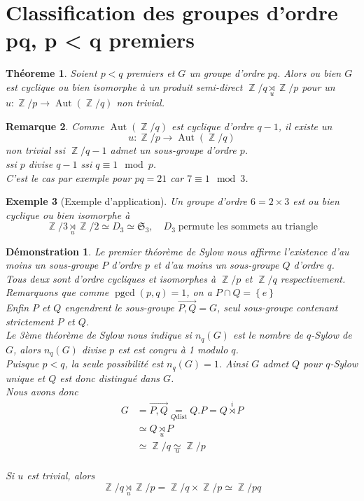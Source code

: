 \documentclass[a4paper, oneside]{report}
\theoremstyle{break}
\newtheorem{thm}{Théoreme}[section] %
\newtheorem{exemple}[thm]{Exemple}
\newtheorem{remarque}[thm]{Remarque}
\newtheorem*{demonstration}{Démonstration}
\DeclareMathOperator{\Z}{\mathbb{Z}}
\DeclarePairedDelimiter\ens{\left\{ }{\right\} }%
\DeclareMathOperator{\pgcd}{pgcd}
\DeclareMathOperator{\Aut}{Aut}
\renewcommand{\ens}[1]{\left\{ #1 \right\} }%
\newcommand{\us}{\underset}
\newcommand{\os}{\overset}
\begin{document}
\section{Classification des groupes d'ordre pq, p < q premiers}

\begin{thm}
Soient $p < q$ premiers et $G$ un groupe d'ordre $pq$. Alors ou bien $G$ est cyclique ou bien isomorphe à un produit semi-direct $\Z/q \us{u}{\rtimes} \Z/p$ pour un $u : \Z/p \rightarrow \Aut(\Z/q)$ non trivial.
\end{thm}

\begin{remarque}
Comme $\Aut(\Z/q)$ est cyclique d'ordre $q - 1$, il existe un 
\[
u : \Z/p \rightarrow \Aut(\Z/q)
\]
non trivial ssi $\Z/q-1$ admet un sous-groupe d'ordre $p$.\\
ssi $p$ divise $q - 1$ ssi $q \equiv 1 \mod p$.\\
C'est le cas par exemple pour $pq = 21$ car $7 \equiv 1 \mod 3$.
\end{remarque}

\begin{exemple}[Exemple d'application]
Un groupe d'ordre $6 = 2 \times 3$ est ou bien cyclique ou bien isomorphe à
\[
\Z/3 \us{u}{\rtimes} \Z/2 \simeq D_3	\simeq \mathfrak{S}_3, \quad	D_3 \; \text{permute les sommets au triangle}
\]
\end{exemple}

\begin{demonstration}
Le premier théorème de Sylow nous affirme l'existence d'au moins un sous-groupe $P$ d'ordre $p$ et d'au moins un sous-groupe $Q$ d'ordre $q$. Tous deux sont d'ordre cycliques et isomorphes à $\Z/p$ et $\Z/q$ respectivement. Remarquons que comme $\pgcd(p,q) = 1$, on a $P \cap Q = \ens{e}$\\
Enfin $P$ et $Q$ engendrent le sous-groupe $\vec{P, Q} = G$, seul sous-groupe contenant strictement $P$ et $Q$.\\
Le 3ème théorème de Sylow nous indique si $n_q(G)$ est le nombre de $q$-Sylow de $G$, alors $n_q(G)$ divise $p$ est est congru à 1 modulo $q$.\\
Puisque $p < q$, la seule possibilité est $n_q(G) = 1$. Ainsi $G$ admet $Q$ pour $q$-Sylow unique et $Q$ est donc distingué dans $G$.\\
Nous avons donc
\begin{align*}
G &= \vec{P, Q} \us{Q \text{dist}}{=} Q . P = Q \os{i}{\rtimes} P
\\
&\simeq Q \us{u}{\rtimes} P
\\
&\simeq \Z/q \us{u}{\simeq} \Z/p
\end{align*}\\
Si $u$ est trivial, alors
\[
\Z/q \us{u}{\rtimes} \Z/p = \Z/q \times \Z/p \simeq \Z/pq
\]
\end{demonstration}
\end{document}

